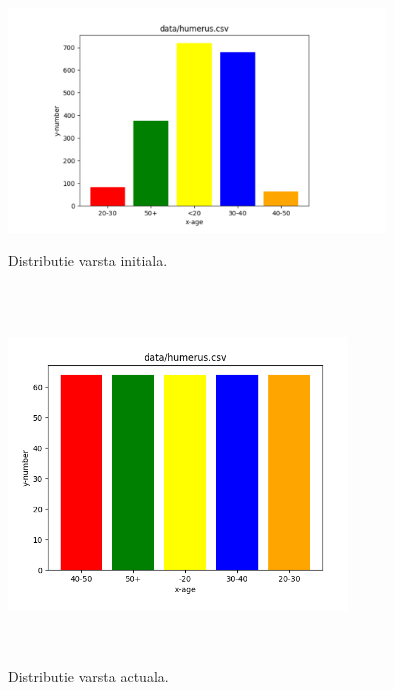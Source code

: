 \documentclass[runningheads,a4paper,11pt]{report}
\begin{document}
\begin{figure}
  \centering
  \begin{minipage}[b]{0.4\textwidth}
    \includegraphics[width=10cm]{Imagini/plot_age_init.PNG}
    \caption{Distributie varsta initiala.}
  \end{minipage}
  \hfill
  \begin{minipage}[b]{0.4\textwidth}
    \includegraphics[width=9cm,height=10cm]{Imagini/plot_humerus_age.png}
    \caption{Distributie varsta actuala.}
  \end{minipage}
\end{figure}
\end{document}
